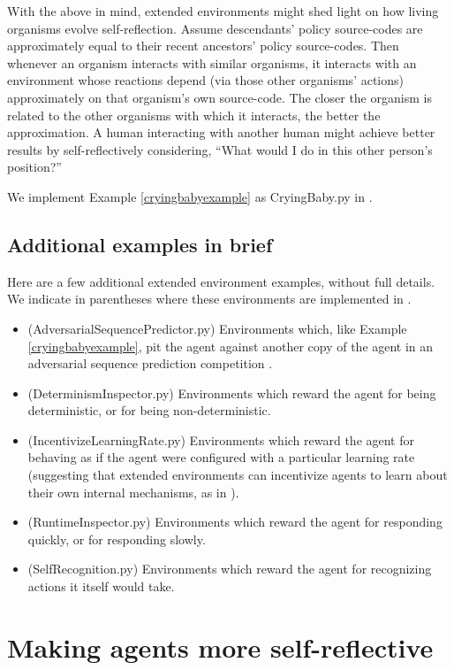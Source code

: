 \documentclass{article}
\begin{document}
With the above in mind, extended environments might shed light on how living organisms
evolve self-reflection. Assume descendants'
policy source-codes are approximately equal to their recent ancestors' policy source-codes.
Then whenever an organism interacts with similar organisms,
it interacts with an environment whose reactions depend (via those other organisms' actions)
approximately on that organism's own source-code. The closer the organism is related
to the other organisms with which it interacts, the better the approximation.
A human interacting with another human might achieve better results by self-reflectively
considering, ``What would I do in this other person's position?''

We implement Example \ref{cryingbabyexample} as CryingBaby.py in \cite{library}.

\subsection{Additional examples in brief}

Here are a few additional extended environment examples, without full details.
We indicate in parentheses where these environments are implemented in \cite{library}.

\begin{itemize}
  \item
  (AdversarialSequencePredictor.py) Environments which, like Example \ref{cryingbabyexample}, pit the agent against
  another copy of the agent in an adversarial sequence prediction competition
  \cite{hibbard2008adversarial}.
  \item
  (DeterminismInspector.py) Environments which reward the agent for being deterministic,
  or for being non-deterministic.
  \item
  (IncentivizeLearningRate.py) Environments which reward the agent for behaving as if
  the agent were configured with a particular learning rate (suggesting that extended
  environments can incentivize agents to learn about their own internal mechanisms,
  as in \cite{sherstan2016introspective}).
  \item
  (RuntimeInspector.py) Environments which reward the agent for responding quickly,
  or for responding slowly.
  \item
  (SelfRecognition.py) Environments which reward the agent for recognizing actions it itself
  would take.
\end{itemize}

\section{Making agents more self-reflective}
\label{realitychecksection}
\end{document}
